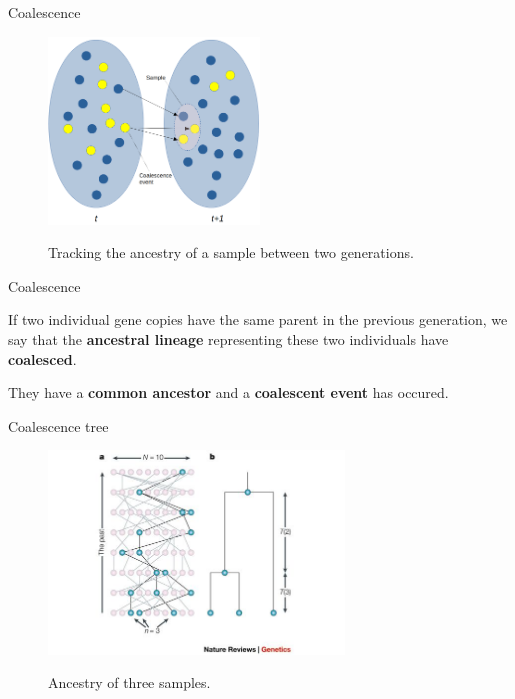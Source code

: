 \begin{frame}{Coalescence}

	\begin{figure}
                \includegraphics[width=0.5\textwidth]{Pics/coalescence} \
		\caption{Tracking the ancestry of a sample between two generations.}
        \end{figure}

\end{frame}


\begin{frame}{Coalescence}

	If two individual gene copies have the same parent in the previous generation, we say that the \textbf{ancestral lineage}
	representing these two individuals have \textbf{coalesced}.

	\bigskip

	They have a \textbf{common ancestor} and a \textbf{coalescent event} has occured.

\end{frame}


\begin{frame}{Coalescence tree}

        \begin{figure}
                \includegraphics[width=0.7\textwidth]{Pics/coal_tree} \
                \caption{Ancestry of three samples.}
        \end{figure}

\end{frame}


